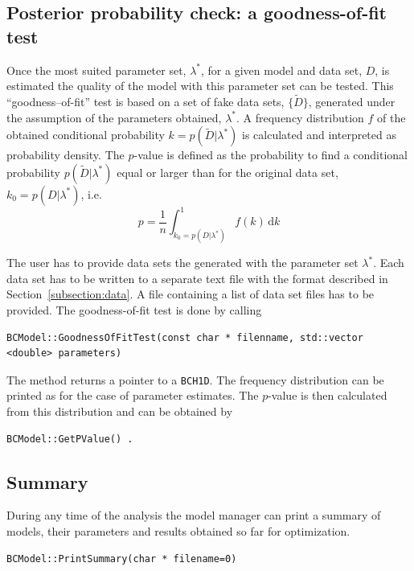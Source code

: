 \documentclass[11pt, a4paper]{article}
\begin{document}
\subsection{Posterior probability check: a goodness-of-fit test} 

Once the most suited parameter set, $\lambda^{*}$, for a given model
and data set, $D$, is estimated the quality of the model with this
parameter set can be tested. This ``goodness--of-fit'' test is based
on a set of fake data sets, $\{ \tilde{D} \}$, generated under the
assumption of the parameters obtained, $\lambda^{*}$. A frequency
distribution $f$ of the obtained conditional probability
$k=p(\tilde{D}|\lambda^{*})$ is calculated and interpreted as
probability density. The $p$-value is defined as the probability to
find a conditional probability $p(\tilde{D}|\lambda^{*})$ equal or
larger than for the original data set, $k_{0}=p(D|\lambda^{*})$, i.e.
%
\begin{equation}
p = \frac{1}{n} \int_{k_{0}=p(D|\lambda^{*})}^{1} f(k) \, \mathrm{d}k 
\end{equation} 

\noindent 
The user has to provide data sets the generated with the parameter set
$\lambda^{*}$. Each data set has to be written to a separate text file
with the format described in Section~\ref{subsection:data}. A file
containing a list of data set files has to be provided. The
goodness-of-fit test is done by calling
%
\begin{verbatim}
BCModel::GoodnessOfFitTest(const char * filenname, std::vector <double> parameters) 
\end{verbatim} 

\noindent 
The method returns a pointer to a \verb|BCH1D|. The frequency
distribution can be printed as for the case of parameter
estimates. The $p$-value is then calculated from this distribution and
can be obtained by 
%
\begin{verbatim}
BCModel::GetPValue() . 
\end{verbatim} 


\subsection{Summary} 

During any time of the analysis the model manager can print a summary
of models, their parameters and results obtained so far for
optimization. 
%
\begin{verbatim}
BCModel::PrintSummary(char * filename=0)
\end{verbatim} 
\end{document}
